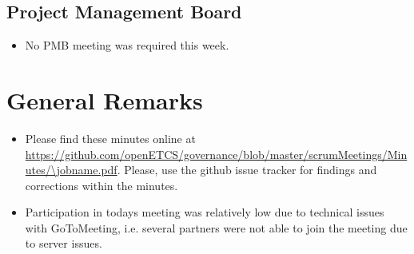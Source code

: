 \documentclass[a4paper, 11pt]{article}
\begin{document}
\subsection{Project Management Board}
\begin{itemize}
\item No PMB meeting was required this week.
\end{itemize}


\section{General Remarks}

\begin{itemize}
\item Please find these minutes online at \url{https://github.com/openETCS/governance/blob/master/scrumMeetings/Minutes/\jobname.pdf}. Please, use the github issue tracker for findings and corrections within the minutes.
\item Participation in todays meeting was relatively low due to technical issues with GoToMeeting, i.e. several partners were not able to join the meeting due to server issues.
\end{itemize}
\end{document}
